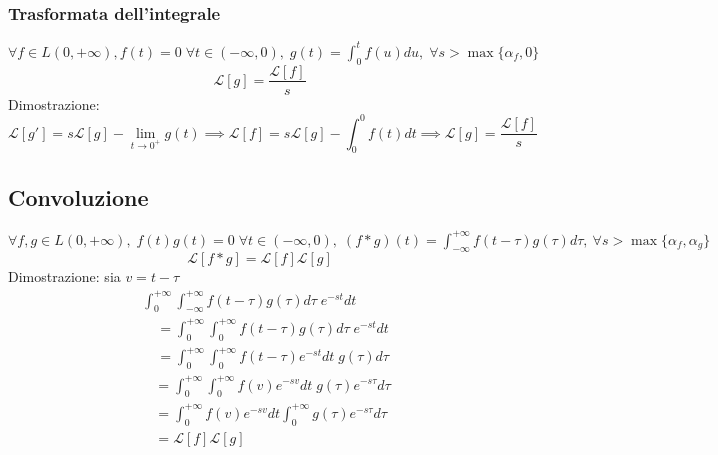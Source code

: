             \subsubsection{Trasformata dell'integrale}
                $\forall f \in L(0, +\infty), f(t) = 0 \; \forall t \in (-\infty, 0), \; \displaystyle g(t) = \int_{0}^{t} f(u) du, \; \forall s > \max\{\alpha_f, 0\}$
                \[
                    \mathcal{L}[g] = \frac{\mathcal{L}[f]}{s}
                \]
                Dimostrazione:
                \[
                    \mathcal{L}[g'] = s\mathcal{L}[g] - \lim_{t \rightarrow 0^{+}} g(t) \implies \mathcal{L}[f] = s\mathcal{L}[g] - \int_{0}^{0} f(t) dt \implies \mathcal{L}[g] = \frac{\mathcal{L}[f]}{s}
                \]

        \subsection{Convoluzione}
                $\forall f, g \in L(0, +\infty), \; f(t)g(t) = 0 \; \forall t \in (-\infty, 0), \; (f * g)(t) = \displaystyle \int_{-\infty}^{+\infty} f(t - \tau)g(\tau)d\tau, \: \forall s > \max\{\alpha_f, \alpha_g\}$
                \[
                    \mathcal{L}[f * g] = \mathcal{L}[f] \mathcal{L}[g]
                \]
                Dimostrazione: sia $v = t - \tau$
                \[
                    \begin{aligned}
                        &\int_{0}^{+\infty} \int_{-\infty}^{+\infty}
                        f(t - \tau)g(\tau) d\tau \; e^{-st} dt \\
                        &\quad= \int_{0}^{+\infty} \int_{0}^{+\infty}
                        f(t - \tau)g(\tau) d\tau \; e^{-st} dt \\
                        &\quad= \int_{0}^{+\infty} \int_{0}^{+\infty}
                        f(t - \tau) e^{-st} dt \; g(\tau) d\tau
                    \end{aligned}
                \]
                \[
                    \begin{aligned}
                        &\quad= \int_{0}^{+\infty} \int_{0}^{+\infty}
                        f(v) e^{-sv} dt \; g(\tau) e^{-s\tau} d\tau \\
                        &\quad= \int_{0}^{+\infty} f(v) e^{-sv} dt
                        \int_{0}^{+\infty} g(\tau) e^{-s\tau} d\tau \\
                        &\quad= \mathcal{L}[f]\mathcal{L}[g]
                    \end{aligned}
                \]


